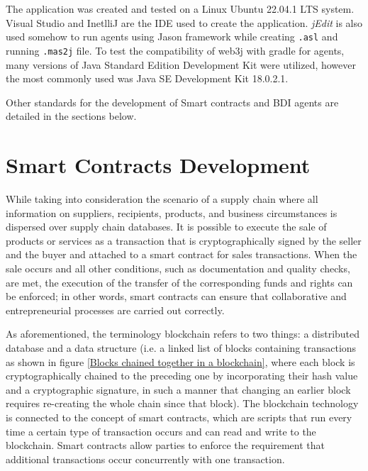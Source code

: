 The application was created and tested on a Linux Ubuntu 22.04.1 LTS system.
Visual Studio and InetlliJ are the \ac{IDE} used to create the application. \textit{jEdit} is also used somehow to run agents using Jason framework while creating \texttt{.asl} and running \texttt{.mas2j} file.
To test the compatibility of web3j with gradle for agents, many versions of Java Standard Edition Development Kit were utilized, however the most commonly used was Java SE Development Kit 18.0.2.1. 

\vspace{.5cm}

Other standards for the development of Smart contracts and \ac{BDI} agents are detailed in the sections below.

\section{Smart Contracts Development }   

While taking into consideration the scenario of a supply chain where all information on suppliers, recipients, products, and business circumstances is dispersed over supply chain databases.
It is possible to execute the sale of products or services as a transaction that is cryptographically signed by the seller and the buyer and attached to a smart contract for sales transactions. When the sale occurs and all other conditions, such as documentation and quality checks, are met, the execution of the transfer of the corresponding funds and rights can be enforced; in other words, smart contracts can ensure that collaborative and entrepreneurial processes are carried out correctly.

\vspace{.5cm}

As aforementioned, the terminology blockchain refers to two things: a distributed database and a data structure (i.e. a linked list of blocks containing transactions as shown in figure \ref{Blocks chained together in a blockchain}, where each block is cryptographically chained to the preceding one by incorporating their hash value and a cryptographic signature, in such a manner that changing an earlier block requires re-creating the whole chain since that block). The blockchain technology is connected to the concept of smart contracts, which are scripts that run every time a certain type of transaction occurs and can read and write to the blockchain. Smart contracts allow parties to enforce the requirement that additional transactions occur concurrently with one transaction.

